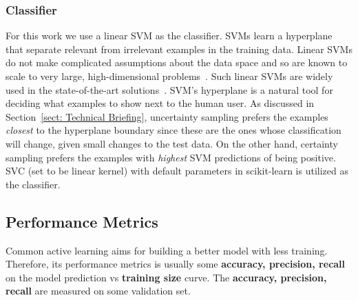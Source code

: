 \documentclass{svjour3}
\theoremstyle{break}
\begin{document}
\subsubsection{Classifier}

For this work we use a linear SVM as the classifier.
SVMs learn a hyperplane that separate relevant from irrelevant examples
in the training data. Linear SVMs do not make complicated assumptions about the data space and so are known to scale to very large, high-dimensional problems~\cite{joachims2006training}. Such linear SVMs are widely used in the state-of-the-art solutions~\cite{miwa2014reducing,cormack2015autonomy,wallace2010semi}. SVM's hyperplane is a natural tool for deciding what examples to show next to the human user. As discussed in Section~\ref{sect: Technical Briefing}, uncertainty sampling prefers the examples {\em closest} to the hyperplane boundary since these are the ones whose classification will
change, given small changes to the test data. On the other hand, certainty sampling prefers the examples with {\em highest} SVM predictions of being positive. SVC (set to be linear kernel) with default parameters in scikit-learn is utilized as the classifier.


\subsection{Performance Metrics}
\label{subsect: Performance Metrics}

Common active learning aims for building a better model with less training. Therefore, its performance metrics is usually some \textbf{accuracy, precision, recall} on the model prediction vs \textbf{training size} curve. The \textbf{accuracy, precision, recall} are measured on some validation set.
\end{document}
